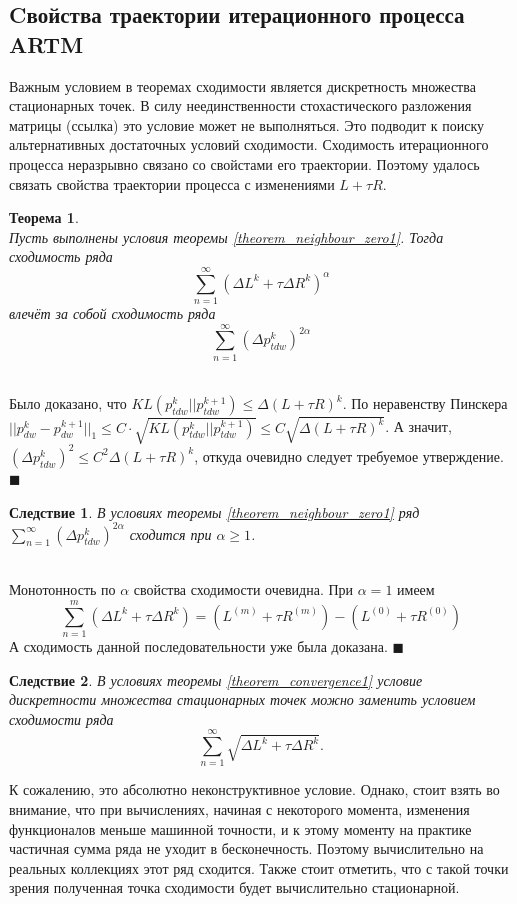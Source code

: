 \documentclass[12pt]{article}
\newtheorem{theorem}{Теорема}
\newtheorem{conseq}{Следствие}[theorem]
\newenvironment{Proof} 
	{\par\noindent{\bf Доказательство.}} 
	{\hfill$\blacksquare$}
\renewcommand{\leq}{\leqslant}
\renewcommand{\geq}{\geqslant}
\begin{document}
	\subsection{Cвойства траектории итерационного процесса ARTM}
Важным условием в теоремах сходимости является дискретность множества стационарных точек. В силу неединственности стохастического разложения матрицы (ссылка) это условие может не выполняться. Это подводит к поиску альтернативных достаточных условий сходимости. Сходимость итерационного процесса неразрывно связано со свойстами его траектории. Поэтому удалось связать свойства траектории процесса с изменениями $L + \tau R$.
\begin{theorem} \label{theorem_series}\ \\
	Пусть выполнены условия теоремы \ref{theorem_neighbour_zero1}. Тогда сходимость ряда
	\[
		\sum\limits_{n=1}^{\infty} (\Delta L^{k} + \tau \Delta R^{k})^{\alpha}
	\]
	влечёт за собой сходимость ряда
	\[
		\sum\limits_{n=1}^{\infty} (\Delta p_{tdw}^{k})^{2 \alpha}
	\]
\end{theorem}
\begin{Proof}\ \\
Было доказано, что $KL(p_{tdw}^{k}||p_{tdw}^{k+1}) \leq \Delta (L + \tau R)^{k}$. По неравенству Пинскера $|| p_{dw}^{k} - p_{dw}^{k+1}||_1 \leq C \cdot \sqrt{KL(p_{tdw}^{k}||p_{tdw}^{k+1})} \leq C \sqrt{\Delta (L + \tau R)^{k}}$. А значит, $ (\Delta p_{tdw}^{k})^{2} \leq C^2 \Delta (L + \tau R)^{k} $, откуда очевидно следует требуемое утверждение.
\end{Proof}\ \\
\begin{conseq}
В условиях теоремы  \ref{theorem_neighbour_zero1} ряд  $\sum\limits_{n=1}^{\infty} (\Delta p_{tdw}^{k})^{2 \alpha}$ сходится при $\alpha \geq 1$.
\end{conseq}
\begin{Proof}\ \\
Монотонность по $\alpha$ свойства сходимости очевидна. При $\alpha=1$ имеем
\[
\sum\limits_{n=1}^{m} (\Delta L^{k} + \tau \Delta R^{k}) = ( L^{(m)} + \tau R^{(m)}) - ( L^{(0)} + \tau R^{(0)})
\]
А сходимость данной последовательности уже была доказана.
\end{Proof}\ \\
\begin{conseq}
В условиях теоремы  \ref{theorem_convergence1} условие дискретности множества стационарных точек можно заменить условием сходимости ряда
\[
\sum\limits_{n=1}^{\infty} \sqrt{\Delta L^{k} + \tau \Delta R^{k}}.
\]
\end{conseq}
К сожалению, это абсолютно неконструктивное условие. Однако, стоит взять во внимание, что при вычислениях, начиная с некоторого момента, изменения функционалов меньше машинной точности, и к этому моменту на практике частичная сумма ряда не уходит в бесконечность. Поэтому вычислительно на реальных коллекциях этот ряд сходится. Также стоит отметить, что с такой точки зрения полученная точка  сходимости будет вычислительно стационарной.
\end{document}
